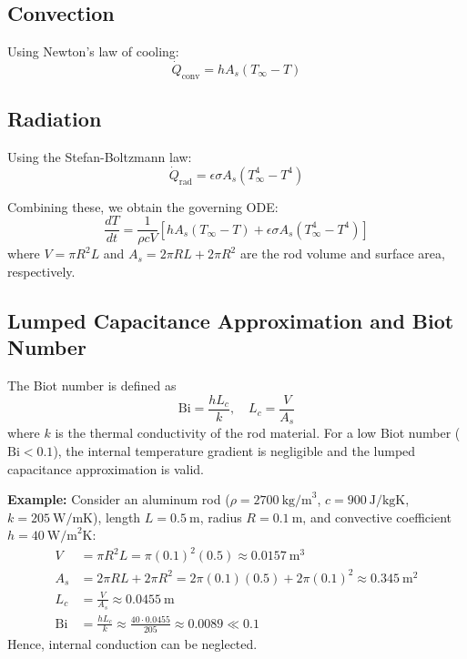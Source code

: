 \documentclass[12pt,a4paper]{article}
\begin{document}
\subsection{Convection}
Using Newton's law of cooling:
\begin{equation}
\dot Q_\text{conv} = h A_s (T_\infty - T)
\end{equation}

\subsection{Radiation}
Using the Stefan-Boltzmann law:
\begin{equation}
\dot Q_\text{rad} = \epsilon \sigma A_s (T_\infty^4 - T^4)
\end{equation}

Combining these, we obtain the governing ODE:
\begin{equation}
\frac{dT}{dt} = \frac{1}{\rho c V} \left[ h A_s (T_\infty - T) + \epsilon \sigma A_s (T_\infty^4 - T^4) \right]
\end{equation}
where \(V = \pi R^2 L\) and \(A_s = 2\pi R L + 2 \pi R^2\) are the rod volume and surface area, respectively.  

\subsection{Lumped Capacitance Approximation and Biot Number}
The Biot number is defined as
\begin{equation}
\text{Bi} = \frac{h L_c}{k}, \quad L_c = \frac{V}{A_s}
\end{equation}
where \(k\) is the thermal conductivity of the rod material. For a low Biot number (\(\text{Bi} < 0.1\)), the internal temperature gradient is negligible and the lumped capacitance approximation is valid.

\textbf{Example:} Consider an aluminum rod (\(\rho = 2700~\text{kg/m}^3\), \(c = 900~\text{J/kgK}\), \(k = 205~\text{W/mK}\)), length \(L = 0.5~\text{m}\), radius \(R = 0.1~\text{m}\), and convective coefficient \(h = 40~\text{W/m}^2\text{K}\):
\begin{align*}
V &= \pi R^2 L = \pi (0.1)^2 (0.5) \approx 0.0157~\text{m}^3 \\
A_s &= 2\pi R L + 2\pi R^2 = 2\pi(0.1)(0.5) + 2\pi(0.1)^2 \approx 0.345~\text{m}^2 \\
L_c &= \frac{V}{A_s} \approx 0.0455~\text{m} \\
\text{Bi} &= \frac{h L_c}{k} \approx \frac{40 \cdot 0.0455}{205} \approx 0.0089 \ll 0.1
\end{align*}
Hence, internal conduction can be neglected.
\end{document}
